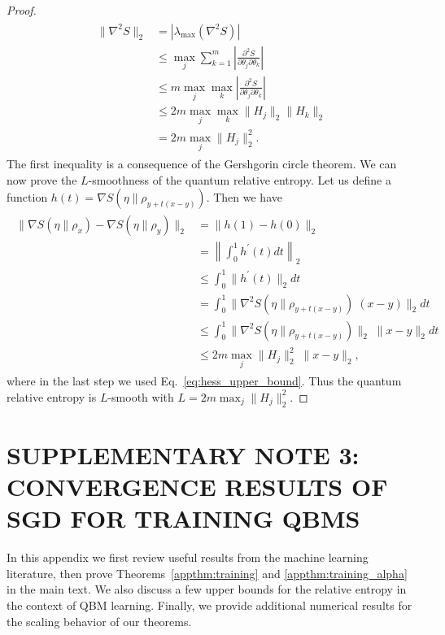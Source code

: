 \documentclass[
    reprint,
    aps,
    prx,
    longbibliography
]{revtex4-2}
\begin{document}
\begin{proof}
\begin{align}
\begin{split}
\label{eq:hess_upper_bound}
\| \nabla^2 S \|_2 &= | \lambda_\mathrm{max}(\nabla^2 S)| \\
&\leq \max_j \sum_{k=1}^m  \left| \frac{\partial^2 S}{\partial \theta_{j} \partial \theta_{k}} \right| \\
&\leq m \max_j \max_k  \left| \frac{\partial^2 S}{\partial \theta_{j} \partial \theta_{k}} \right| \\
&\leq 2m \max_j \max_k \| H_j \|_2 \| H_k \|_2 \\
&= 2 m \max_j \| H_j \|_2^2 .
\end{split}
\end{align}
The first inequality is a consequence of the Gershgorin circle theorem. We can now prove the $L$-smoothness of the quantum relative entropy. Let us define a function $h(t) = \nabla S(\eta \|\rho_{y + t(x - y)})$. Then we have
\begin{align}
\begin{split}
\| \nabla S(\eta \|\rho_{x}) - \nabla S(\eta \|\rho_{y}) \|_2 &= \| h(1) - h(0) \|_2 \\
&= \left\| \int_0^1 h^\prime(t) dt \right\|_2 \\
&\leq \int_0^1 \| h^\prime (t) \|_2 dt \\ 
&= \int_0^1 \| \nabla^2 S(\eta \|\rho_{y + t(x - y)}) \; (x - y) \|_2 dt  \\
&\leq \int_0^1 \| \nabla^2 S(\eta \|\rho_{y + t(x - y)}) \|_2 \; \| x - y \|_2  dt \\
&\leq 2m \max_j \| H_j \|_2^2 \; \| x - y \|_2 ,
\end{split}
\end{align}
where in the last step we used Eq.~\eqref{eq:hess_upper_bound}. Thus the quantum relative entropy is $L$-smooth with $L=2m \max_j \| H_j \|_2^2$.
\end{proof}


\section*{\MakeUppercase{Supplementary Note 3: Convergence results of SGD for training QBMs}}

In this appendix we first review useful results from the machine learning literature, then prove Theorems~\ref{appthm:training} and \ref{appthm:training_alpha} in the main text. We also discuss a few upper bounds for the relative entropy in the context of QBM learning. Finally, we provide additional numerical results for the scaling behavior of our theorems.
\end{document}
